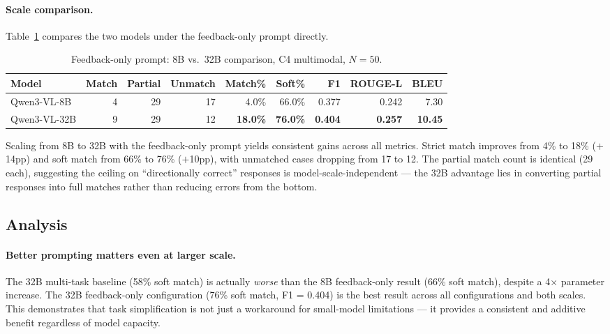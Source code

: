 \documentclass{article}
\begin{document}
\paragraph{Scale comparison.}
Table~\ref{tab:scale} compares the two models under the feedback-only prompt directly.

\begin{table}[H]
\centering
\small
\caption{Feedback-only prompt: 8B vs.\ 32B comparison, C4 multimodal, $N{=}50$.}
\label{tab:scale}
\begin{tabular}{@{}lrrrrrrrr@{}}
\toprule
Model & Match & Partial & Unmatch & Match\% & Soft\% & F1 & ROUGE-L & BLEU \\
\midrule
Qwen3-VL-8B  & 4 & 29 & 17 & 4.0\%  & 66.0\% & 0.377 & 0.242 & 7.30 \\
Qwen3-VL-32B & 9 & 29 & 12 & \textbf{18.0\%} & \textbf{76.0\%} & \textbf{0.404} & \textbf{0.257} & \textbf{10.45} \\
\bottomrule
\end{tabular}
\end{table}

Scaling from 8B to 32B with the feedback-only prompt yields consistent gains across all metrics. Strict
match improves from 4\% to 18\% ($+$14pp) and soft match from 66\% to 76\% ($+$10pp), with unmatched
cases dropping from 17 to 12. The partial match count is identical (29 each), suggesting the ceiling on
``directionally correct'' responses is model-scale-independent --- the 32B advantage lies in converting
partial responses into full matches rather than reducing errors from the bottom.

\subsection{Analysis}

\paragraph{Better prompting matters even at larger scale.}
The 32B multi-task baseline (58\% soft match) is actually \emph{worse} than the 8B feedback-only
result (66\% soft match), despite a 4$\times$ parameter increase. The 32B feedback-only configuration
(76\% soft match, F1 = 0.404) is the best result across all configurations and both scales. This
demonstrates that task simplification is not just a workaround for small-model limitations --- it
provides a consistent and additive benefit regardless of model capacity.
\end{document}
